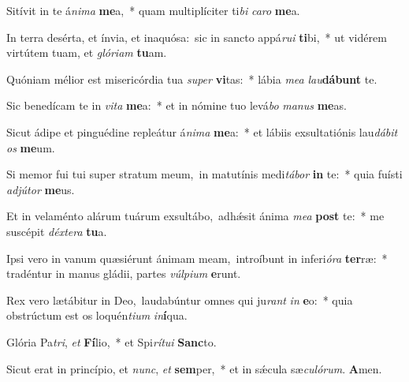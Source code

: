 Sitívit in te á\textit{ni}\textit{ma} \textbf{me}a,~* quam multiplíciter ti\textit{bi} \textit{ca}\textit{ro} \textbf{me}a.

In terra desérta, et ínvia, et inaquósa:~\reddagger sic in sancto appá\textit{ru}\textit{i} \textbf{ti}bi,~* ut vidérem virtútem tuam, et \textit{gló}\textit{ri}\textit{am} \textbf{tu}am.

Quóniam mélior est misericórdia tua \textit{su}\textit{per} \textbf{vi}tas:~* lábia \textit{me}\textit{a} \textit{lau}\textbf{dá}\textbf{bunt} te.

Sic benedícam te in \textit{vi}\textit{ta} \textbf{me}a:~* et in nómine tuo levá\textit{bo} \textit{ma}\textit{nus} \textbf{me}as.

Sicut ádipe et pinguédine repleátur á\textit{ni}\textit{ma} \textbf{me}a:~* et lábiis exsultatiónis lau\textit{dá}\textit{bit} \textit{os} \textbf{me}um.

Si memor fui tui super stratum meum,~\reddagger in matutínis medi\textit{tá}\textit{bor} \textbf{in} te:~* quia fuísti \textit{ad}\textit{jú}\textit{tor} \textbf{me}us.

Et in velaménto alárum tuárum exsultábo,~\reddagger adhǽsit ánima \textit{me}\textit{a} \textbf{post} te:~* me suscépit \textit{déx}\textit{te}\textit{ra} \textbf{tu}a.

Ipsi vero in vanum quæsiérunt ánimam meam,~\reddagger introíbunt in inferi\textit{ó}\textit{ra} \textbf{ter}ræ:~* tradéntur in manus gládii, partes \textit{vúl}\textit{pi}\textit{um} \textbf{e}runt.

Rex vero lætábitur in Deo,~\reddagger laudabúntur omnes qui ju\textit{rant} \textit{in} \textbf{e}o:~* quia obstrúctum est os loquén\textit{ti}\textit{um} \textit{in}\textbf{í}qua.

Glória Pa\textit{tri}, \textit{et} \textbf{Fí}lio,~* et Spi\textit{rí}\textit{tu}\textit{i} \textbf{Sanc}to.

Sicut erat in princípio, et \textit{nunc}, \textit{et} \textbf{sem}per,~* et in sǽcula sæ\textit{cu}\textit{ló}\textit{rum}. \textbf{A}men.

